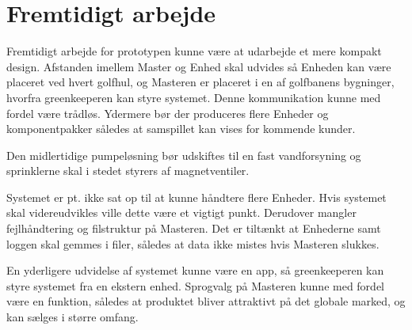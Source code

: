 \chapter{Fremtidigt arbejde}

Fremtidigt arbejde for prototypen kunne være at udarbejde et mere kompakt design. Afstanden imellem Master og Enhed skal udvides så Enheden kan være placeret ved hvert golfhul, og Masteren er placeret i en af golfbanens bygninger, hvorfra greenkeeperen kan styre systemet. Denne kommunikation kunne med fordel være trådløs. Ydermere bør der produceres flere Enheder og komponentpakker således at samspillet kan vises for kommende kunder. 

Den midlertidige pumpeløsning bør udskiftes til en fast vandforsyning og sprinklerne skal i stedet styrers af magnetventiler. 

Systemet er pt. ikke sat op til at kunne håndtere flere Enheder. Hvis systemet skal videreudvikles ville dette være et vigtigt punkt. Derudover mangler fejlhåndtering og filstruktur på Masteren. Det er tiltænkt at Enhederne samt loggen skal gemmes i filer, således at data ikke mistes hvis Masteren slukkes.

En yderligere udvidelse af systemet kunne være en app, så greenkeeperen kan styre systemet fra en ekstern enhed. Sprogvalg på Masteren kunne med fordel være en funktion, således at produktet bliver attraktivt på det globale marked, og kan sælges i større omfang.